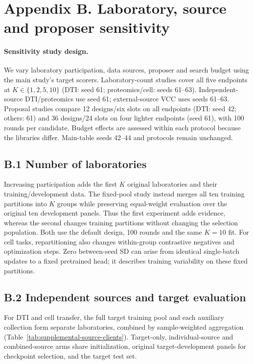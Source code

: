 \clearpage
\section*{Appendix B. Laboratory, source and proposer sensitivity}
\label{app:core}
\setcounter{table}{0}
\renewcommand{\thetable}{B.\arabic{table}}
\renewcommand{\theHtable}{B.\arabic{table}}
\paragraph{Sensitivity study design.}
We vary laboratory participation, data sources, proposer and search budget using the main study's target scorers. Laboratory-count studies cover all five endpoints at $K\in\{1,2,5,10\}$ (DTI: seed 61; proteomics/cell: seeds 61--63). Independent-source DTI/proteomics use seed 61; external-source VCC uses seeds 61--63. Proposal studies compare 12 designs/six slots on all endpoints (DTI: seed 42; others: 61) and 36 designs/24 slots on four lighter endpoints (seed 61), with 100 rounds per candidate. Budget effects are assessed within each protocol because the libraries differ. Main-table seeds 42--44 and protocols remain unchanged.

\subsection*{B.1 Number of laboratories}
Increasing participation adds the first $K$ original laboratories and their training/development data. The fixed-pool study instead merges all ten training partitions into $K$ groups while preserving equal-weight evaluation over the original ten development panels. Thus the first experiment adds evidence, whereas the second changes training partitions without changing the selection population. Both use the default design, 100 rounds and the same $K=10$ fit. For cell tasks, repartitioning also changes within-group contrastive negatives and optimization steps. Zero between-seed SD can arise from identical single-batch updates to a fixed pretrained head; it describes training variability on these fixed partitions.




\subsection*{B.2 Independent sources and target evaluation}
For DTI and cell transfer, the full target training pool and each auxiliary collection form separate laboratories, combined by sample-weighted aggregation (Table~\ref{tab:supplemental-source-clients}). Target-only, individual-source and combined-source arms share initialization, original target-development panels for checkpoint selection, and the target test set.

